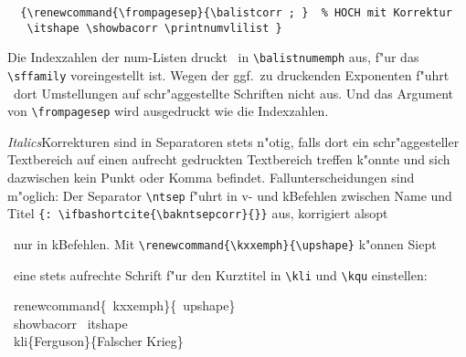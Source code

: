 \documentclass[12pt,a4paper]{article}
\newcommand{\pdfko}[1]{\kern #1pt
                          \strut\ignorespaces}%
\newcommand{\pbs}{\string\ \unskip}
\newcommand{\bs}{\protect\pbs}
\begin{document}
\vspace{.25ex}
{\small
\begin{verbatim}
  {\renewcommand{\frompagesep}{\balistcorr ; }  % HOCH mit Korrektur
   \itshape \showbacorr \printnumvlilist }
\end{verbatim}}

\vspace{-3ex}
  {\renewcommand{\frompagesep}{\balistcorr ; }  %
   \itshape \showbacorr \batwocolitemdefs\printnumvlilist }


\vspace{-.5ex}{\small
\begin{verbatim}
  {\renewcommand{\frompagesep}{, }          % NIEDRIG ohne Korrektur
   \renewcommand{\ntsep}{\upshape , }     % Komma zw. Name und Titel
   \itshape \showbacorr \printnumvlilist }
\end{verbatim}}

\vspace{-3ex}
  {\renewcommand{\frompagesep}{, }              %
   \renewcommand{\ntsep}{\upshape , }     %
   \itshape \showbacorr \baonecolitemdefs\printnumvlilist }


\vspace{1.5ex}\noindent
Die Indexzahlen der num-Listen druckt \BibArts\ in 
\verb|\balistnumemph| aus, f"ur das \verb|\sffamily| voreingestellt 
ist. \label{listnum} Wegen der ggf.\ zu druckenden Exponenten f"uhrt \BibArts\ 
dort Umstellungen auf schr"aggestellte Schriften nicht aus. Und das Argument 
von \verb|\frompagesep| wird ausgedruckt wie die Indexzahlen.

\vspace{2ex}\noindent
\textit{Italics}\hy Korrekturen sind in Separatoren stets n"otig, 
falls dort ein schr"aggesteller Textbereich auf einen aufrecht gedruckten
Textbereich treffen k"onnte und sich dazwischen kein Punkt oder Komma befindet.
Fallunterscheidungen sind m"oglich: Der Separator \verb|\ntsep| f"uhrt 
in v- und k\fhy Befehlen zwischen Name und Titel 
\verb|{: \ifbashortcite{\bakntsepcorr}{}}| \label{ntsepB} 
aus, korrigiert also\pdfko{1.25}\ 
nur in k\fhy Befehlen.
Mit \verb|\renewcommand{\kxxemph}{\upshape}| k"onnen Sie\pdfko{1.25}\  
eine stets aufrechte Schrift f"ur den Kurztitel in 
\verb|\kli| und \verb|\kqu| einstellen: 

\vspace{-.325ex}
\Doppelbox
{
   \bs renewcommand\{\bs kxxemph\}\{\bs upshape\}
\\ \bs showbacorr \bs itshape
\\ \bs kli\{Ferguson\}\{Falscher Krieg\}
}
{
\vspace{5ex}
\renewcommand{\kxxemph}{\upshape}
\showbacorr \itshape
{}
}
\end{document}
